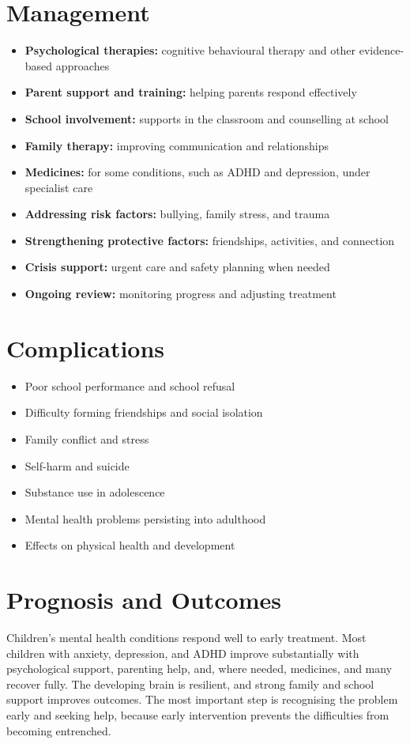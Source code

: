 \section*{Management}
\begin{itemize}
    \item \textbf{Psychological therapies:} cognitive behavioural therapy and other evidence-based approaches
    \item \textbf{Parent support and training:} helping parents respond effectively
    \item \textbf{School involvement:} supports in the classroom and counselling at school
    \item \textbf{Family therapy:} improving communication and relationships
    \item \textbf{Medicines:} for some conditions, such as ADHD and depression, under specialist care
    \item \textbf{Addressing risk factors:} bullying, family stress, and trauma
    \item \textbf{Strengthening protective factors:} friendships, activities, and connection
    \item \textbf{Crisis support:} urgent care and safety planning when needed
    \item \textbf{Ongoing review:} monitoring progress and adjusting treatment
\end{itemize}

\section*{Complications}
\begin{itemize}
    \item Poor school performance and school refusal
    \item Difficulty forming friendships and social isolation
    \item Family conflict and stress
    \item Self-harm and suicide
    \item Substance use in adolescence
    \item Mental health problems persisting into adulthood
    \item Effects on physical health and development
\end{itemize}

\section*{Prognosis and Outcomes}
Children's mental health conditions respond well to early treatment. Most children with anxiety, depression, and ADHD improve substantially with psychological support, parenting help, and, where needed, medicines, and many recover fully. The developing brain is resilient, and strong family and school support improves outcomes. The most important step is recognising the problem early and seeking help, because early intervention prevents the difficulties from becoming entrenched.

